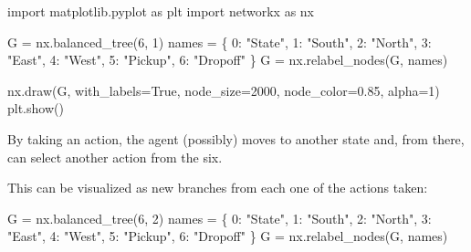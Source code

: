 \documentclass[
  letterpaper,
]{scrbook}
\newenvironment{Shaded}{\begin{snugshade}}{\end{snugshade}}
\newcommand{\DecValTok}[1]{\textcolor[rgb]{0.68,0.00,0.00}{#1}}
\newcommand{\ImportTok}[1]{\textcolor[rgb]{0.00,0.46,0.62}{#1}}
\newcommand{\NormalTok}[1]{\textcolor[rgb]{0.00,0.23,0.31}{#1}}
\newcommand{\OperatorTok}[1]{\textcolor[rgb]{0.37,0.37,0.37}{#1}}
\newcommand{\StringTok}[1]{\textcolor[rgb]{0.13,0.47,0.30}{#1}}
\newcommand{\VariableTok}[1]{\textcolor[rgb]{0.07,0.07,0.07}{#1}}
\begin{document}
\begin{Shaded}
\begin{Highlighting}[]
\ImportTok{import}\NormalTok{ matplotlib.pyplot }\ImportTok{as}\NormalTok{ plt}
\ImportTok{import}\NormalTok{ networkx }\ImportTok{as}\NormalTok{ nx}

\NormalTok{G }\OperatorTok{=}\NormalTok{ nx.balanced\_tree(}\DecValTok{6}\NormalTok{, }\DecValTok{1}\NormalTok{)}
\NormalTok{names }\OperatorTok{=}\NormalTok{ \{}
    \DecValTok{0}\NormalTok{: }\StringTok{"State"}\NormalTok{,}
    \DecValTok{1}\NormalTok{: }\StringTok{"South"}\NormalTok{,}
    \DecValTok{2}\NormalTok{: }\StringTok{"North"}\NormalTok{,}
    \DecValTok{3}\NormalTok{: }\StringTok{"East"}\NormalTok{,}
    \DecValTok{4}\NormalTok{: }\StringTok{"West"}\NormalTok{,}
    \DecValTok{5}\NormalTok{: }\StringTok{"Pickup"}\NormalTok{,}
    \DecValTok{6}\NormalTok{: }\StringTok{"Dropoff"}
\NormalTok{\}}
\NormalTok{G }\OperatorTok{=}\NormalTok{ nx.relabel\_nodes(G, names)}
\end{Highlighting}
\end{Shaded}

\begin{Shaded}
\begin{Highlighting}[]
\NormalTok{nx.draw(G, with\_labels}\OperatorTok{=}\VariableTok{True}\NormalTok{, node\_size}\OperatorTok{=}\DecValTok{2000}\NormalTok{, node\_color}\OperatorTok{=}\StringTok{\textquotesingle{}0.85\textquotesingle{}}\NormalTok{, alpha}\OperatorTok{=}\DecValTok{1}\NormalTok{)}
\NormalTok{plt.show()}
\end{Highlighting}
\end{Shaded}

By taking an action, the agent (possibly) moves to another state and,
from there, can select another action from the six.

This can be visualized as new branches from each one of the actions
taken:

\begin{Shaded}
\begin{Highlighting}[]
\NormalTok{G }\OperatorTok{=}\NormalTok{ nx.balanced\_tree(}\DecValTok{6}\NormalTok{, }\DecValTok{2}\NormalTok{)}
\NormalTok{names }\OperatorTok{=}\NormalTok{ \{}
    \DecValTok{0}\NormalTok{: }\StringTok{"State"}\NormalTok{,}
    \DecValTok{1}\NormalTok{: }\StringTok{"South"}\NormalTok{,}
    \DecValTok{2}\NormalTok{: }\StringTok{"North"}\NormalTok{,}
    \DecValTok{3}\NormalTok{: }\StringTok{"East"}\NormalTok{,}
    \DecValTok{4}\NormalTok{: }\StringTok{"West"}\NormalTok{,}
    \DecValTok{5}\NormalTok{: }\StringTok{"Pickup"}\NormalTok{,}
    \DecValTok{6}\NormalTok{: }\StringTok{"Dropoff"}
\NormalTok{\}}
\NormalTok{G }\OperatorTok{=}\NormalTok{ nx.relabel\_nodes(G, names)}
\end{Highlighting}
\end{Shaded}
\end{document}
